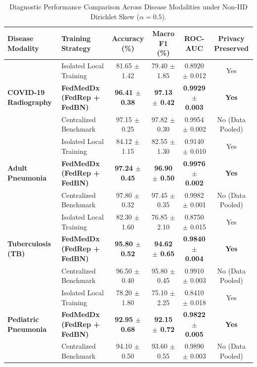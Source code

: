 \documentclass[conference]{IEEEtran}
\begin{document}
\begin{table}[t]
\centering
\caption{Diagnostic Performance Comparison Across Disease Modalities under Non-IID Dirichlet Skew ($\alpha = 0.5$).}
\label{tab:main_results}
\vspace{-0.15cm}
\renewcommand{\arraystretch}{0.94}
\setlength{\tabcolsep}{4.5pt}
\begin{tabular}{llcccc}
\toprule
\textbf{Disease Modality} & \textbf{Training Strategy} & \textbf{Accuracy (\%)} & \textbf{Macro F1 (\%)} & \textbf{ROC-AUC} & \textbf{Privacy Preserved} \\
\midrule
\multirow{3}{*}{\textbf{COVID-19 Radiography}} 
 & Isolated Local Training & 81.65 $\pm$ 1.42 & 79.40 $\pm$ 1.85 & 0.8920 $\pm$ 0.012 & Yes \\
 & \textbf{FedMedDx (FedRep + FedBN)} & \textbf{96.41 $\pm$ 0.38} & \textbf{97.13 $\pm$ 0.42} & \textbf{0.9929 $\pm$ 0.003} & \textbf{Yes} \\
 & Centralized Benchmark & 97.15 $\pm$ 0.25 & 97.82 $\pm$ 0.30 & 0.9954 $\pm$ 0.002 & No (Data Pooled) \\
\midrule
\multirow{3}{*}{\textbf{Adult Pneumonia}} 
 & Isolated Local Training & 84.12 $\pm$ 1.15 & 82.55 $\pm$ 1.30 & 0.9140 $\pm$ 0.010 & Yes \\
 & \textbf{FedMedDx (FedRep + FedBN)} & \textbf{97.24 $\pm$ 0.45} & \textbf{96.90 $\pm$ 0.50} & \textbf{0.9976 $\pm$ 0.002} & \textbf{Yes} \\
 & Centralized Benchmark & 97.80 $\pm$ 0.32 & 97.45 $\pm$ 0.35 & 0.9982 $\pm$ 0.001 & No (Data Pooled) \\
\midrule
\multirow{3}{*}{\textbf{Tuberculosis (TB)}} 
 & Isolated Local Training & 82.30 $\pm$ 1.60 & 76.85 $\pm$ 2.10 & 0.8750 $\pm$ 0.015 & Yes \\
 & \textbf{FedMedDx (FedRep + FedBN)} & \textbf{95.80 $\pm$ 0.52} & \textbf{94.62 $\pm$ 0.65} & \textbf{0.9840 $\pm$ 0.004} & \textbf{Yes} \\
 & Centralized Benchmark & 96.50 $\pm$ 0.40 & 95.80 $\pm$ 0.45 & 0.9910 $\pm$ 0.003 & No (Data Pooled) \\
\midrule
\multirow{3}{*}{\textbf{Pediatric Pneumonia}} 
 & Isolated Local Training & 78.20 $\pm$ 1.80 & 75.10 $\pm$ 2.25 & 0.8410 $\pm$ 0.018 & Yes \\
 & \textbf{FedMedDx (FedRep + FedBN)} & \textbf{92.95 $\pm$ 0.68} & \textbf{92.15 $\pm$ 0.72} & \textbf{0.9822 $\pm$ 0.005} & \textbf{Yes} \\
 & Centralized Benchmark & 94.10 $\pm$ 0.50 & 93.60 $\pm$ 0.55 & 0.9890 $\pm$ 0.003 & No (Data Pooled) \\
\bottomrule
\end{tabular}
\vspace{-0.20cm}
\end{table}
\end{document}
